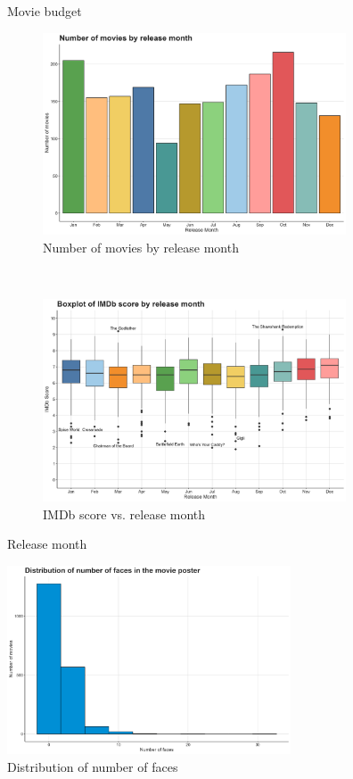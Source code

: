 \documentclass[12pt,a4paper]{article}
\begin{document}
\begin{appendices}
\begin{figure}[h]
        \caption{Movie budget}
        \label{fig:budget}
    \end{figure}

    \begin{figure}[h]
        \begin{subfigure}[t]{0.5\textwidth}
            \includegraphics[width=0.95\linewidth, height=6cm]{release_month.png}
            \caption{Number of movies by release month}
            \label{fig:release-month-bar}
        \end{subfigure}
        ~
        \begin{subfigure}[t]{0.5\textwidth}
            \includegraphics[width=0.95\linewidth, height=6cm]{release_month_imdb_score.png}
            \caption{IMDb score vs. release month}
            \label{fig:release-month-box}
        \end{subfigure}

        \caption{Release month}
        \label{fig:release-month}
    \end{figure}

    \begin{figure}[h]
        \centering
        \includegraphics[width=0.75\textwidth]{number_faces.png}
        \caption{Distribution of number of faces}
        \label{fig:faces-hist}
    \end{figure}


\end{appendices}
\end{document}
